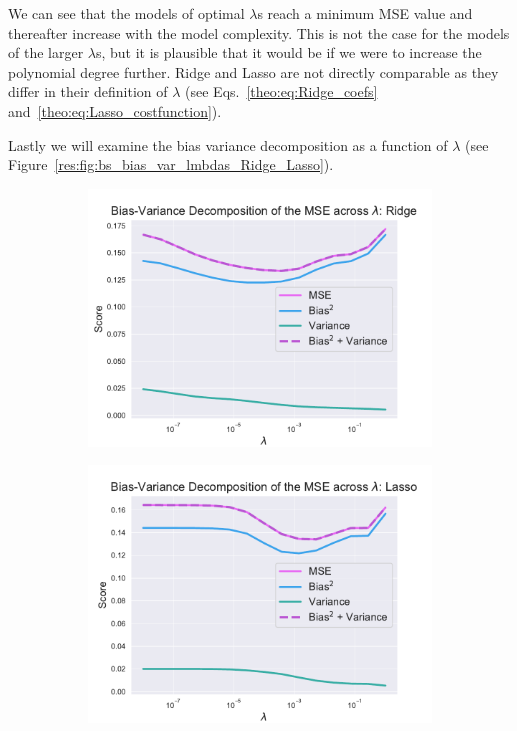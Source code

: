 \documentclass[twocolumn,english,notitlepage]{article}
\begin{document}
            We can see that the models of optimal $\lambda$s reach a minimum MSE value and thereafter increase with the model complexity. This is not the case for the models of the larger $\lambda$s, but it is plausible that it would be if we were to increase the polynomial degree further. Ridge and Lasso are not directly comparable as they differ in their definition of $\lambda$ (see Eqs.~\eqref{theo:eq:Ridge_coefs} and~\eqref{theo:eq:Lasso_costfunction}).   
            
            Lastly we will examine the bias variance decomposition as a function of $\lambda$ (see Figure~\ref{res:fig:bs_bias_var_lmbdas_Ridge_Lasso}).  

            \begin{figure}[ht]
                \begin{subfigure}{\linewidth}
                    \centering
                    \includegraphics[width=\linewidth]{BS_bias_var_lmbdas_Ridge.pdf}
                \end{subfigure}
                \begin{subfigure}{\linewidth}
                    \centering
                    \includegraphics[width=\linewidth]{BS_bias_var_lmbdas_Lasso.pdf}

\end{subfigure}
\end{figure}
\end{document}
